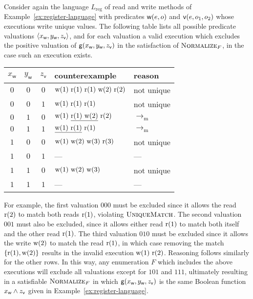 \begin{example}

  Consider again the language $L_\mathrm{reg}$ of read and write methods of
  Example~\ref{ex:register-language} with predicates ${\sf w}(e,o)$ and ${\sf
  v}(e,o_1,o_2)$ whose executions write unique values. The following table
  lists all possible predicate valuations ${\left\langle{x_{\sf w}, y_{\sf w}, z_{\sf
  v}}\right\rangle}$, and for each valuation a valid execution which excludes the positive
  valuation of ${\sf g}(x_{\sf w}, y_{\sf w}, z_{\sf v})$ in the satisfaction
  of $\textsc{Normalize}_F$, in the case such an execution exists.
  \begin{center}
    \begin{tabular}{ccc|ll}
      $x_\mathsf{w}$ & $y_\mathsf{w}$ & $z_\mathsf{v}$ & counterexample & reason \\
      \hline
      $0$ & $0$ & $0$ & ${\rm w}(1) \ {\rm r}(1) \ {\rm r}(1) \ {\rm w}(2) \ {\rm r}(2)$ & not unique \\
      $0$ & $0$ & $1$ & ${\rm w}(1) \ {\rm r}(1) \ {\rm r}(1)$ & not unique \\
      $0$ & $1$ & $0$ & ${\rm w}(1) \ \underline{{\rm r}(1) \ {\rm w}(2)} \ {\rm r}(2)$ & $\to_\mathrm{m}$ \\
      $0$ & $1$ & $1$ & $\underline{{\rm w}(1) \ {\rm r}(1)} \ {\rm r}(1)$ & $\to_\mathrm{m}$ \\
      $1$ & $0$ & $0$ & ${\rm w}(1) \ {\rm w}(2) \ {\rm w}(3) \ {\rm r}(3)$ & not unique \\
      $1$ & $0$ & $1$ & — & — \\
      $1$ & $1$ & $0$ & ${\rm w}(1) \ {\rm w}(2) \ {\rm w}(3)$ & not unique \\
      $1$ & $1$ & $1$ & — & — \\
    \end{tabular}
  \end{center}
  For example, the first valuation $000$ must be excluded since it allows the
  read ${\rm r}(2)$ to match both reads ${\rm r}(1)$, violating
  $\textsc{UniqueMatch}$. The second valuation $001$ must also be excluded,
  since it allows either read ${\rm r}(1)$ to match both itself and the other
  read ${\rm r}(1)$. The third valuation $010$ must be excluded since it allows
  the write ${\rm w}(2)$ to match the read ${\rm r}(1)$, in which case removing
  the match ${\{{ {\rm r}(1), {\rm w}(2) }\}}$ results in the invalid execution
  ${\rm w}(1)\ {\rm r}(2)$. Reasoning follows similarly for the other rows.
  In this way, any enumeration $F$ which includes the above executions
  will exclude all valuations except for $101$ and $111$, ultimately resulting
  in a satisfiable $\textsc{Normalize}_F$ in which ${\sf g}(x_{\sf w}, y_{\sf
  w}, z_{\sf v})$ is the same Boolean function $x_{\sf w} \land z_{\sf v}$
  given in Example~\ref{ex:register-language}.

\end{example}

